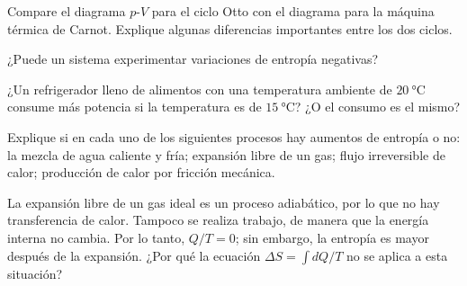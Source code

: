 %
\begin{Exercise}
  {}{}
  Compare el diagrama $p$-$V$ para el ciclo Otto con el diagrama para la máquina térmica de Carnot. Explique algunas diferencias importantes entre los dos ciclos.
\end{Exercise}
%
\begin{Exercise}
  ¿Puede un sistema experimentar variaciones de entropía negativas?
\end{Exercise}
%
\begin{Exercise}
  ¿Un refrigerador lleno de alimentos con una temperatura ambiente de $\SI{20}{\celsius}$ consume más potencia si la temperatura es de $\SI{15}{\celsius}$? ¿O el consumo es el mismo?
\end{Exercise}
%
\begin{Exercise}
  Explique si en cada uno de los siguientes procesos hay aumentos de entropía o no: la mezcla de agua caliente y fría; expansión libre de un gas; flujo irreversible de calor; producción de calor por fricción mecánica.
\end{Exercise}
%
\begin{Exercise}
  La expansión libre de un gas ideal es un proceso adiabático, por lo que no hay transferencia de calor. Tampoco se realiza trabajo, de manera que la energía interna no cambia. Por lo tanto, $Q/T = 0$; sin embargo, la entropía es mayor después de la expansión. ¿Por qué la ecuación $\Delta S = \int dQ/T$ no se aplica a esta situación?
\end{Exercise}
%
